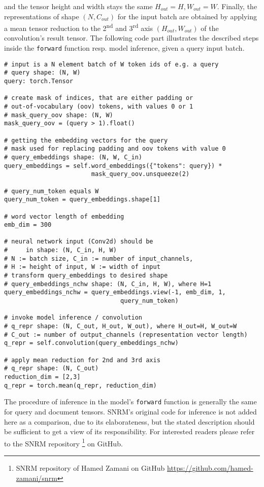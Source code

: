     and the tensor height and width stays the same $H_{out} = H, W_{out} = W$.
Finally, the representations of shape $(N, C_{out})$ for the input batch are obtained by 
    applying a mean tensor reduction to the 2\textsuperscript{nd} and 3\textsuperscript{rd} axis $(H_{out}, W_{out})$
    of the convolution's result tensor.
The following code part illustrates the described steps inside the \texttt{forward} function resp. model inference, 
    given a query input batch.
\begin{verbatim}
# input is a N element batch of W token ids of e.g. a query
# query shape: (N, W)
query: torch.Tensor

# create mask of indices, that are either padding or 
# out-of-vocabulary (oov) tokens, with values 0 or 1
# mask_query_oov shape: (N, W)
mask_query_oov = (query > 1).float() 

# getting the embedding vectors for the query
# mask used for replacing padding and oov tokens with value 0
# query_embeddings shape: (N, W, C_in)
query_embeddings = self.word_embeddings({"tokens": query}) * 
                        mask_query_oov.unsqueeze(2) 

# query_num_token equals W
query_num_token = query_embeddings.shape[1]

# word vector length of embedding
emb_dim = 300

# neural network input (Conv2d) should be 
#     in shape: (N, C_in, H, W)
# N := batch size, C_in := number of input_channels,    
# H := height of input, W := width of input
# transform query_embeddings to desired shape
# query_embeddings_nchw shape: (N, C_in, H, W), where H=1
query_embeddings_nchw = query_embeddings.view(-1, emb_dim, 1, 
                                query_num_token)

# invoke model inference / convolution
# q_repr shape: (N, C_out, H_out, W_out), where H_out=H, W_out=W
# C_out := number of output_channels (representation vector length)
q_repr = self.convolution(query_embeddings_nchw)

# apply mean reduction for 2nd and 3rd axis
# q_repr shape: (N, C_out)
reduction_dim = [2,3]
q_repr = torch.mean(q_repr, reduction_dim)
\end{verbatim}

The procedure of inference in the model's \texttt{forward} function is generally
    the same for query and document tensors.
SNRM's original code for inference is not added here as a comparison, due to its 
    elaborateness, but the stated description should be sufficient
    to get a view of its responsibility.
For interested readers please refer to the SNRM repository
    \footnote{SNRM repository of Hamed Zamani on GitHub \url{https://github.com/hamed-zamani/snrm}}
    on GitHub.

